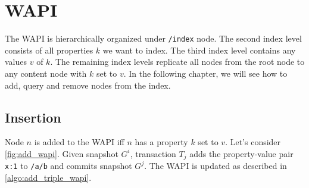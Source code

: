 \documentclass[abstracton,12pt]{scrreprt}
\begin{document}
\chapter{WAPI}

The WAPI is hierarchically organized under \texttt{/index} node.
The second index level consists of all properties $k$ we want to index.
The third index level contains any values $v$ of $k$.
The remaining index levels replicate all nodes from the root node to any content node with $k$ set to $v$.
In the following chapter, we will see how to add, query and remove nodes from the index.

\section{Insertion}

Node $n$ is added to the WAPI iff $n$ has a property $k$ set to $v$.
Let's consider \cref{fig:add_wapi}.
Given snapshot $G^i$, transaction $T_j$ adds the property-value pair \texttt{x:1} to \texttt{/a/b} and commits snapshot $G^j$.
The WAPI is updated as described in \cref{algo:add_triple_wapi}.
\end{document}
